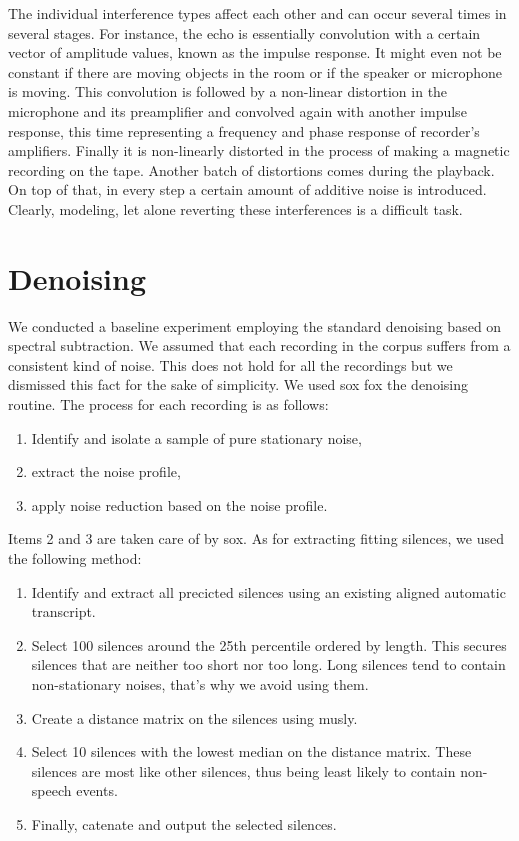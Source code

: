 \documentclass[runningheads]{llncs}
\begin{document}
The individual interference types affect each other and can occur several times
in several stages. For instance, the echo is essentially convolution with a certain vector of
amplitude values, known as the impulse response. It might even not be
constant if there are moving objects in the room or if the speaker or
microphone is moving. This convolution is followed by a non-linear
distortion in the microphone and its preamplifier and convolved again with
another impulse response, this time representing a frequency and phase
response of recorder's amplifiers. Finally it is non-linearly distorted in
the process of making a magnetic recording on the tape. Another batch of
distortions comes during the playback. On top of that, in every step a certain
amount of additive noise is introduced. Clearly, modeling, let alone reverting these
interferences is a difficult task.

\section{Denoising}

We conducted a baseline experiment employing the standard denoising based on
spectral subtraction. We assumed that each recording in the
corpus suffers from a consistent kind of noise. This does not hold for all the
recordings but we dismissed this fact for the sake of simplicity. We used sox
fox the denoising routine. The process for each recording is as follows:
\begin{enumerate}
\item{Identify and isolate a sample of pure stationary noise,}
\item{extract the noise profile,}
\item{apply noise reduction based on the noise profile.}
\end{enumerate}

Items 2 and 3 are taken care of by sox. As for extracting fitting silences, we
used the following method:
\begin{enumerate}
\item{
    Identify and extract all precicted silences using an
    existing aligned automatic transcript.
}
\item{
    Select 100 silences around the 25th percentile ordered by length.
    This secures silences that are neither too short nor too long. Long silences
    tend to contain non-stationary noises, that's why we avoid using them.
}
\item{
    Create a distance matrix on the silences using
    musly\cite{schnitzer2011using}.
}
\item{
    Select 10 silences with the lowest median on the distance matrix. These
    silences are most like other silences, thus being least likely to contain
    non-speech events.
}
\item{
    Finally, catenate and output the selected silences.
}
\end{enumerate}
\end{document}
